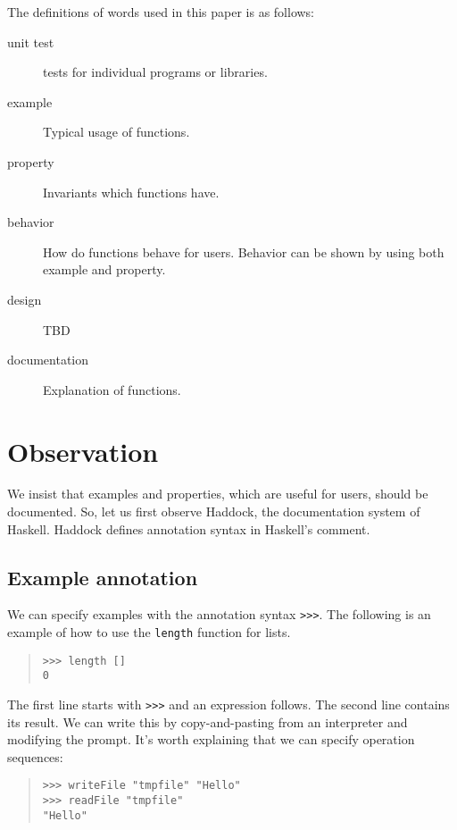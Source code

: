 \documentclass[preprint]{sigplanconf}
\begin{document}
The definitions of words used in this paper is as follows:

\begin{description}
\item[unit test] tests for individual programs or libraries.
\item[example] Typical usage of functions.
\item[property] Invariants which functions have.
\item[behavior] How do functions behave for users. Behavior can be shown by using both example and property.
\item[design] TBD
\item[documentation] Explanation of functions.
\end{description}

\section{Observation}

We insist that examples and properties, which are useful for users, should be
documented.
So, let us first observe Haddock, the documentation system of Haskell. Haddock defines annotation syntax in Haskell's comment.

\subsection{Example annotation}

We can specify examples with the annotation syntax {\tt >>>}.
The following is an example of how to use the {\tt length} function
for lists.

\begin{quote}
\begin{verbatim}
>>> length []
0
\end{verbatim}
\end{quote}

\noindent The first line starts with {\tt >>>} and an expression follows. The second line contains its result. We can write this by copy-and-pasting from an interpreter and modifying the prompt.
It's worth explaining that we can specify operation sequences:

\begin{quote}
\begin{verbatim}
>>> writeFile "tmpfile" "Hello"
>>> readFile "tmpfile"
"Hello"
\end{verbatim}
\end{quote}
\end{document}
